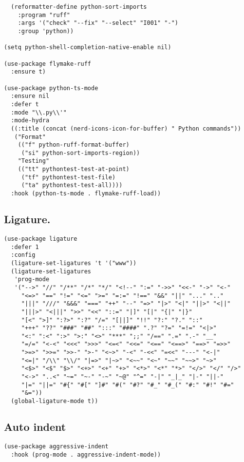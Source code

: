 \documentclass[11pt]{article}
\begin{document}
\begin{verbatim}
  (reformatter-define python-sort-imports
    :program "ruff"
    :args '("check" "--fix" "--select" "I001" "-")
    :group 'python))

(setq python-shell-completion-native-enable nil)

(use-package flymake-ruff
  :ensure t)

(use-package python-ts-mode
  :ensure nil
  :defer t
  :mode "\\.py\\'"
  :mode-hydra
  ((:title (concat (nerd-icons-icon-for-buffer) " Python commands"))
   ("Format"
    (("f" python-ruff-format-buffer)
     ("si" python-sort-imports-region))
    "Testing"
    (("tt" pythontest-test-at-point)
     ("tf" pythontest-test-file)
     ("ta" pythontest-test-all))))
  :hook (python-ts-mode . flymake-ruff-load))
\end{verbatim}
\subsection{Ligature.}
\label{sec:org2827e6b}
\begin{verbatim}
(use-package ligature
  :defer 1
  :config
  (ligature-set-ligatures 't '("www"))
  (ligature-set-ligatures
   'prog-mode
   '("-->" "//" "/**" "/*" "*/" "<!--" ":=" "->>" "<<-" "->" "<-"
     "<=>" "==" "!=" "<=" ">=" "=:=" "!==" "&&" "||" "..." ".."
     "|||" "///" "&&&" "===" "++" "--" "=>" "|>" "<|" "||>" "<||"
     "|||>" "<|||" ">>" "<<" "::=" "|]" "[|" "{|" "|}"
     "[<" ">]" ":?>" ":?" "/=" "[||]" "!!" "?:" "?." "::"
     "+++" "??" "###" "##" ":::" "####" ".?" "?=" "=!=" "<|>"
     "<:" ":<" ":>" ">:" "<>" "***" ";;" "/==" ".=" ".-" "__"
     "=/=" "<-<" "<<<" ">>>" "<=<" "<<=" "<==" "<==>" "==>" "=>>"
     ">=>" ">>=" ">>-" ">-" "<~>" "-<" "-<<" "=<<" "---" "<-|"
     "<=|" "/\\" "\\/" "|=>" "|~>" "<~~" "<~" "~~" "~~>" "~>"
     "<$>" "<$" "$>" "<+>" "<+" "+>" "<*>" "<*" "*>" "</>" "</" "/>"
     "<->" "..<" "~=" "~-" "-~" "~@" "^=" "-|" "_|_" "|-" "||-"
     "|=" "||=" "#{" "#[" "]#" "#(" "#?" "#_" "#_(" "#:" "#!" "#="
     "&="))
  (global-ligature-mode t))
\end{verbatim}
\subsection{Auto indent}
\label{sec:org61984e0}
\begin{verbatim}
(use-package aggressive-indent
  :hook (prog-mode . aggressive-indent-mode))
\end{verbatim}
\end{document}
